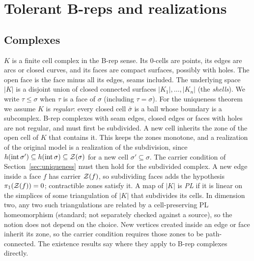 \section{Tolerant B-reps and realizations}\label{sec:setting}

\subsection{Complexes}
$K$ is a finite cell complex in the B-rep sense. Its 0-cells are points, its edges are arcs or closed curves, and
its faces are compact surfaces, possibly with holes. The open face is the face minus all its edges, seams included. The underlying space $|K|$ is a
disjoint union of closed connected surfaces $|K_1|,\dots,|K_n|$ (the \emph{shells}). We write $\tau\le\sigma$ when $\tau$ is a face of $\sigma$ (including
$\tau=\sigma$). For the uniqueness theorem we assume $K$ is \emph{regular}: every closed cell $\bar\sigma$ is a
ball whose boundary is a subcomplex. B-rep complexes with seam edges, closed edges or faces with holes are not
regular, and must first be subdivided. A new cell inherits the zone of the open cell of $K$ that contains it.
This keeps the zones monotone, and a realization of the original model is a realization of the subdivision, since
$h(\operatorname{int}\sigma')\subseteq h(\operatorname{int}\sigma)\subseteq\mathcal{Z}(\sigma)$ for a new cell $\sigma'\subseteq\sigma$. The carrier
condition of Section~\ref{sec:uniqueness} must then hold for the subdivided complex. A new edge inside a face $f$
has carrier $\mathcal{Z}(f)$, so subdividing faces adds the hypothesis $\pi_1(\mathcal{Z}(f))=0$; contractible zones satisfy it. A map of $|K|$ is \emph{PL} if it is linear on the simplices of some triangulation of $|K|$ that subdivides its
cells. In dimension two, any two such triangulations are related by a cell-preserving PL homeomorphism (standard; not
separately checked against a source), so the notion does not depend on the choice. New vertices created inside an edge or face inherit its zone, so the carrier condition requires those
zones to be path-connected. The existence results say where they apply to B-rep
complexes directly.

